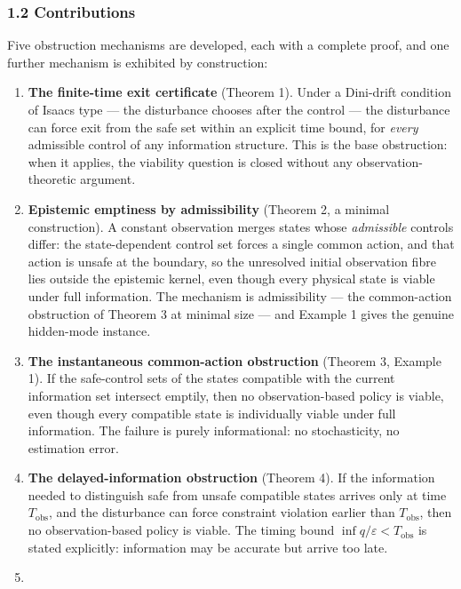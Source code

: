\documentclass[11pt]{article}
\begin{document}
\subsubsection{1.2 Contributions}\label{contributions}

Five obstruction mechanisms are developed, each with a complete proof,
and one further mechanism is exhibited by construction:

\begin{enumerate}
\def\labelenumi{\arabic{enumi}.}
\item
  \textbf{The finite-time exit certificate} (Theorem 1). Under a
  Dini-drift condition of Isaacs type --- the disturbance chooses after
  the control --- the disturbance can force exit from the safe set
  within an explicit time bound, for \emph{every} admissible control of
  any information structure. This is the base obstruction: when it
  applies, the viability question is closed without any
  observation-theoretic argument.
\item
  \textbf{Epistemic emptiness by admissibility} (Theorem 2, a minimal
  construction). A constant observation merges states whose
  \emph{admissible} controls differ: the state-dependent control set
  forces a single common action, and that action is unsafe at the
  boundary, so the unresolved initial observation fibre lies outside the
  epistemic kernel, even though every physical state is viable under
  full information. The mechanism is admissibility --- the common-action
  obstruction of Theorem 3 at minimal size --- and Example 1 gives the genuine hidden-mode instance.
\item
  \textbf{The instantaneous common-action obstruction} (Theorem 3,
  Example 1). If the safe-control sets of the states compatible with the
  current information set intersect emptily, then no observation-based
  policy is viable, even though every compatible state is individually
  viable under full information. The failure is purely informational: no
  stochasticity, no estimation error.
\item
  \textbf{The delayed-information obstruction} (Theorem 4). If the
  information needed to distinguish safe from unsafe compatible states
  arrives only at time \(T_{\mathrm{obs}}\), and the disturbance can
  force constraint violation earlier than \(T_{\mathrm{obs}}\), then no
  observation-based policy is viable. The timing bound
  \(\inf q / \varepsilon < T_{\mathrm{obs}}\) is stated explicitly:
  information may be accurate but arrive too late.
\item

\end{enumerate}
\end{document}
